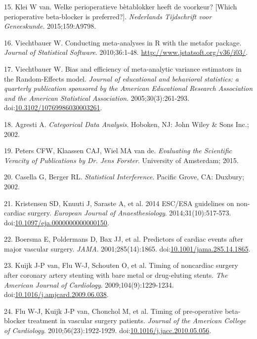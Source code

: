 \documentclass[]{article}
\begin{document}
\hypertarget{ref-klei2015}{}
15. Klei W van. Welke perioperatieve bètablokker heeft de voorkeur?
{[}Which perioperative beta-blocker is preferred?{]}. \emph{Nederlands
Tijdschrift voor Geneeskunde}. 2015;159:A9798.

\hypertarget{ref-viechtbauer2010}{}
16. Viechtbauer W. Conducting meta-analyses in R with the metafor
package. \emph{Journal of Statistical Software}. 2010;36:1-48.
\url{http://www.jstatsoft.org/v36/i03/}.

\hypertarget{ref-viechtbauer2005}{}
17. Viechtbauer W. Bias and efficiency of meta-analytic variance
estimators in the Random-Effects model. \emph{Journal of educational and
behavioral statistics: a quarterly publication sponsored by the American
Educational Research Association and the American Statistical
Association}. 2005;30(3):261-293.
doi:\href{https://doi.org/10.3102/10769986030003261}{10.3102/10769986030003261}.

\hypertarget{ref-agresti2002}{}
18. Agresti A. \emph{Categorical Data Analysis}. Hoboken, NJ: John Wiley
\& Sons Inc.; 2002.

\hypertarget{ref-peters2015}{}
19. Peters CFW, Klaassen CAJ, Wiel MA van de. \emph{Evaluating the
Scientific Veracity of Publications by Dr. Jens Forster}. University of
Amsterdam; 2015.

\hypertarget{ref-casella2002}{}
20. Casella G, Berger RL. \emph{Statistical Interference}. Pacific
Grove, CA: Duxbury; 2002.

\hypertarget{ref-Kristensen_2014}{}
21. Kristensen SD, Knuuti J, Saraste A, et al. 2014 ESC/ESA guidelines
on non-cardiac surgery. \emph{European Journal of Anaesthesiology}.
2014;31(10):517-573.
doi:\href{https://doi.org/10.1097/eja.0000000000000150}{10.1097/eja.0000000000000150}.

\hypertarget{ref-Boersma_2001}{}
22. Boersma E, Poldermans D, Bax JJ, et al. Predictors of cardiac events
after major vascular surgery. \emph{JAMA}. 2001;285(14):1865.
doi:\href{https://doi.org/10.1001/jama.285.14.1865}{10.1001/jama.285.14.1865}.

\hypertarget{ref-van_Kuijk_2009}{}
23. Kuijk J-P van, Flu W-J, Schouten O, et al. Timing of noncardiac
surgery after coronary artery stenting with bare metal or drug-eluting
stents. \emph{The American Journal of Cardiology}.
2009;104(9):1229-1234.
doi:\href{https://doi.org/10.1016/j.amjcard.2009.06.038}{10.1016/j.amjcard.2009.06.038}.

\hypertarget{ref-Flu_2010}{}
24. Flu W-J, Kuijk J-P van, Chonchol M, et al. Timing of pre-operative
beta-blocker treatment in vascular surgery patients. \emph{Journal of
the American College of Cardiology}. 2010;56(23):1922-1929.
doi:\href{https://doi.org/10.1016/j.jacc.2010.05.056}{10.1016/j.jacc.2010.05.056}.
\end{document}
